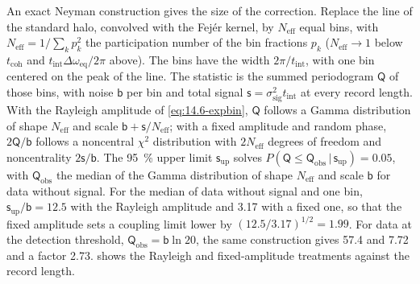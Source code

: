 An exact Neyman construction gives the size of the correction. Replace the line of the standard halo, convolved with the Fejér kernel, by $N_{\mathrm{eff}}$ equal bins, with $N_{\mathrm{eff}} = 1/\sum_kp_k^2$ the participation number of the bin fractions $p_k$ ($N_{\mathrm{eff}} \to 1$ below $t_{\mathrm{coh}}$ and $t_{\mathrm{int}}\Delta\omega_{\mathrm{eq}}/2\pi$ above). The bins have the width $2\pi/t_{\mathrm{int}}$, with one bin centered on the peak of the line. The statistic is the summed periodogram $\mathsf{Q}$ of those bins, with noise $\mathsf{b}$ per bin and total signal $\mathsf{s} = \sigma_{\mathrm{sig}}^2t_{\mathrm{int}}$ at every record length. With the Rayleigh amplitude of \cref{eq:14.6-expbin}, $\mathsf{Q}$ follows a Gamma distribution of shape $N_{\mathrm{eff}}$ and scale $\mathsf{b} + \mathsf{s}/N_{\mathrm{eff}}$; with a fixed amplitude and random phase, $2\mathsf{Q}/\mathsf{b}$ follows a noncentral $\chi^2$ distribution with $2N_{\mathrm{eff}}$ degrees of freedom and noncentrality $2\mathsf{s}/\mathsf{b}$. The \SI{95}{\percent} upper limit $\mathsf{s}_{\mathrm{up}}$ solves $P(\mathsf{Q} \le \mathsf{Q}_{\mathrm{obs}}\,|\,\mathsf{s}_{\mathrm{up}}) = 0.05$, with $\mathsf{Q}_{\mathrm{obs}}$ the median of the Gamma distribution of shape $N_{\mathrm{eff}}$ and scale $\mathsf{b}$ for data without signal. For the median of data without signal and one bin, $\mathsf{s}_{\mathrm{up}}/\mathsf{b} = 12.5$ with the Rayleigh amplitude and 3.17 with a fixed one, so that the fixed amplitude sets a coupling limit lower by $(12.5/3.17)^{1/2} = 1.99$. For data at the detection threshold, $\mathsf{Q}_{\mathrm{obs}} = \mathsf{b}\ln20$, the same construction gives 57.4 and 7.72 and a factor 2.73.  shows the Rayleigh and fixed-amplitude treatments against the record length.
